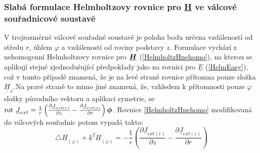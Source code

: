 \documentclass[12pt,a4paper,oneside]{article}
\numberwithin{equation}{section} %
\numberwithin{figure}{section} %
\numberwithin{table}{section} %
\renewcommand{\vec}[1]{\mbox{\boldmath$#1$}} %
\newcommand{\faz}[1]{{\underline{#1}}} %
\newcommand{\rot}{\mathrm{rot}\ }
\begin{document}
\subsubsection{Slabá formulace Helmholtzovy rovnice pro \faz{H} ve válcové souřadnicové soustavě}

V trojrozměrné válcové souřadné soustavě je poloha bodu určena vzdáleností od středu $r$, úhlem $\varphi$ a vzdáleností od roviny podstavy $z$. Formulace vychází z nehomogenní Helmholtzovy rovnice pro $\faz{\vec{H}}$ (\ref{HelmholtzHnehomo}), na kterou se aplikují stejné zjednodušující předpoklady jako na rovnici pro $\faz{E}$ (\ref{HelmEasy}), což v tomto případě znamená, že je na levé straně rovnice přítomna pouze složka $\faz{H} _{\varphi}$.Na pravé straně to mimo jiné znamená, že, vzhledem k přítomnosti pouze $\varphi$ složky původního vektoru a aplikaci symetrie, se $\rot \faz{J} _{ext} = \frac{1}{r} \left( \frac{\partial \faz{J} _{ext(r)}}{\partial z} - \frac{\partial \faz{J} _{ext(z)}}{\partial r} \right) \vec{\phi}$. Rovnice \ref{HelmholtzHnehomo} modifikovaná do válcových souřadnic potom vypadá takto:
\begin{equation}
\triangle \faz{H} _{(\varphi)} + \faz{k} ^2 \faz{H} _{(\varphi)} = - \frac{1}{r} \left(  \frac{\partial \faz{J} _{ext(r)}}{\partial z} - \frac{\partial \faz{J} _{ext(z)}}{\partial r} \right)
\end{equation}
\end{document}
